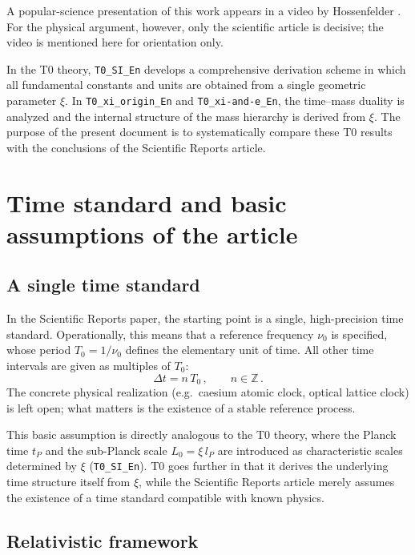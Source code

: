 A popular-science presentation of this work appears in a video by
Hossenfelder \cite{hossenfelder_single_clock_video}. For the physical argument,
however, only the scientific article is decisive; the video is mentioned here
for orientation only.

In the T0 theory, \texttt{T0\_SI\_En} develops a comprehensive derivation
scheme in which all fundamental constants and units are obtained from a single
geometric parameter $\xi$. In \texttt{T0\_xi\_origin\_En} and
\texttt{T0\_xi-and-e\_En}, the time–mass duality is analyzed and the internal
structure of the mass hierarchy is derived from $\xi$. The purpose of the
present document is to systematically compare these T0 results with the
conclusions of the Scientific Reports article.

\section{Time standard and basic assumptions of the article}

\subsection{A single time standard}

In the Scientific Reports paper, the starting point is a single, high-precision
time standard. Operationally, this means that a reference frequency $\nu_0$ is
specified, whose period $T_0 = 1/\nu_0$ defines the elementary unit of time.
All other time intervals are given as multiples of $T_0$:
\begin{equation}
  \Delta t = n \, T_0 \, , \qquad n \in \mathbb{Z} \, .
\end{equation}
The concrete physical realization (e.g.\ caesium atomic clock, optical lattice
clock) is left open; what matters is the existence of a stable reference
process.

This basic assumption is directly analogous to the T0 theory, where the
Planck time $t_P$ and the sub-Planck scale $L_0 = \xi\,l_P$ are introduced as
characteristic scales determined by $\xi$ (\texttt{T0\_SI\_En}). T0 goes
further in that it derives the underlying time structure itself from $\xi$,
while the Scientific Reports article merely assumes the existence of a time
standard compatible with known physics.

\subsection{Relativistic framework}

